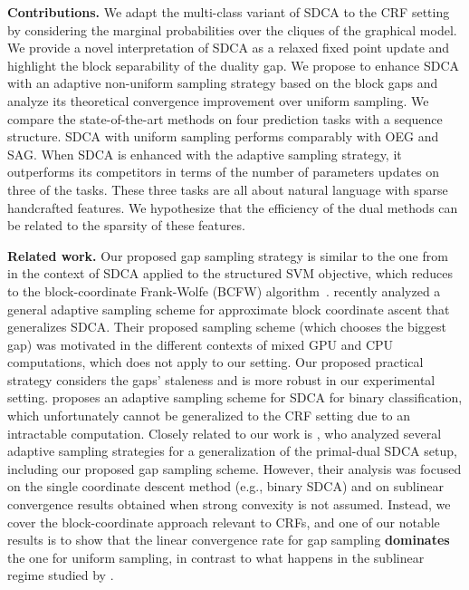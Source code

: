\textbf{Contributions.} We adapt the multi-class variant of SDCA to the CRF setting by considering the marginal probabilities over the cliques of the graphical model.
We provide a novel interpretation of SDCA as a relaxed fixed point update and highlight the block separability of the duality gap.
We propose to enhance SDCA with an adaptive non-uniform sampling strategy based on the block gaps and analyze its theoretical convergence improvement over uniform sampling.
We compare the state-of-the-art methods on four prediction tasks with a sequence structure.
SDCA with uniform sampling performs comparably with OEG and SAG.
When SDCA is enhanced with the adaptive sampling strategy, it outperforms its competitors in terms of the number of parameters updates on three of the tasks.
These three tasks are all about natural language with sparse handcrafted features.
We hypothesize that the efficiency of the dual methods can be related to the sparsity of these features.

\textbf{Related work.}
Our proposed gap sampling strategy is similar to the one from~\citet{osokin2016minding} in the context of SDCA applied to the structured SVM objective, which reduces to the block-coordinate Frank-Wolfe (BCFW) algorithm~\citep{lacoste2013block}.
\citet{dunner2017efficient} recently analyzed a general adaptive sampling scheme for approximate block coordinate ascent that generalizes SDCA.
Their proposed sampling scheme (which chooses the biggest gap) was motivated in the different contexts of mixed GPU and CPU computations, which does not apply to our setting.
Our proposed practical strategy considers the gaps' staleness and is more robust in our experimental setting.
\citet{csiba2015stochastic} proposes an adaptive sampling scheme for SDCA for binary classification, which unfortunately cannot be generalized to the CRF setting due to an intractable computation. Closely related to our work is \citet{perekrestenko17a}, who analyzed several adaptive sampling strategies for a generalization of the primal-dual SDCA setup, including our proposed gap sampling scheme. However, their analysis was focused on the single coordinate descent method (e.g., binary SDCA) and on sublinear convergence results obtained when strong convexity is not assumed. Instead, we cover the block-coordinate approach relevant to CRFs, and one of our notable results is to show that the linear convergence rate for gap sampling \textbf{dominates} the one for uniform sampling, in contrast to what happens in the sublinear regime studied by \citet{perekrestenko17a}.

